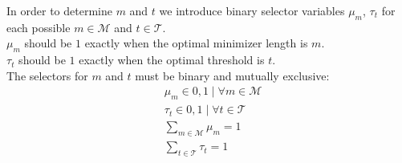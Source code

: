 \documentclass{article}
\newcommand{\possibleMinimizerLength}{\mathcal{M}}
\newcommand{\possibleThresholds}{\mathcal{T}}
\newcommand{\selectorm}{\mu}
\newcommand{\selectort}{\tau}
\begin{document}
In order to determine $m$ and $t$ we introduce binary selector variables $\selectorm_m$, $\selectort_t$ for each possible $m \in \possibleMinimizerLength$ and $t \in \possibleThresholds$.\\
$\selectorm_m$ should be $1$ exactly when the optimal minimizer length is $m$.\\
$\selectort_t$ should be $1$ exactly when the optimal threshold is $t$.\\
The selectors for $m$ and $t$ must be binary and mutually exclusive:
\begin{align*}
	&\selectorm_m \in {0,1} \mid \forall m \in \possibleMinimizerLength \\
	&\selectort_t \in {0,1} \mid \forall t \in \possibleThresholds \\
	&\sum_{m \in \possibleMinimizerLength} \selectorm_m = 1 \\
	&\sum_{t \in \possibleThresholds} \selectort_t = 1
\end{align*}
\end{document}
